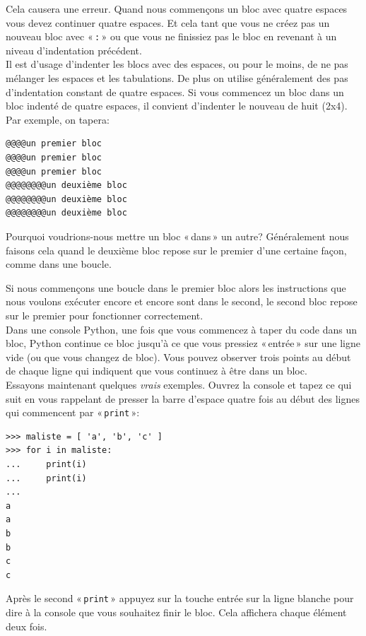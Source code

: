 Cela causera une erreur. Quand nous commençons un bloc avec quatre espaces vous devez continuer quatre espaces. Et cela tant que vous ne créez pas un nouveau bloc avec « \verb+:+ » ou que vous ne finissiez pas le bloc en revenant à un niveau d'indentation précédent.\\

Il est d'usage d'indenter les blocs avec des espaces, ou pour le moins, de ne pas mélanger les espaces et les tabulations. De plus on utilise généralement des pas d'indentation constant de quatre espaces.
Si vous commencez un bloc dans un bloc indenté de quatre espaces, il convient d'indenter le nouveau de huit (2x4).
Par exemple, on tapera:

\begin{Verbatim}[frame=single,rulecolor=\color{gray}, label=ne pas saisir]
@@@@un premier bloc
@@@@un premier bloc
@@@@un premier bloc
@@@@@@@@un deuxième bloc
@@@@@@@@un deuxième bloc
@@@@@@@@un deuxième bloc
\end{Verbatim}

Pourquoi voudrions-nous mettre un bloc « dans » un autre? Généralement nous faisons cela quand le deuxième bloc repose sur le premier d'une certaine façon, comme dans une boucle.

Si nous commençons une boucle dans le premier bloc alors les instructions que nous voulons exécuter encore et encore sont dans le second, le second bloc repose sur le premier pour fonctionner correctement.\\

Dans une console Python, une fois que vous commencez à taper du code dans un bloc, Python continue ce bloc jusqu'à ce que vous pressiez « entrée » sur une ligne vide (ou que vous changez de bloc). Vous pouvez observer trois points au début de chaque ligne qui indiquent que vous continuez à être dans un bloc.\\

Essayons maintenant quelques \emph{vrais} exemples. Ouvrez la console et tapez ce qui suit en vous rappelant de presser la barre d'espace quatre fois au début des lignes qui commencent par « \texttt{print} »:

\begin{Verbatim}[frame=single,rulecolor=\color{green}, label=à saisir avec attention]
>>> maliste = [ 'a', 'b', 'c' ]
>>> for i in maliste:
...     print(i)
...     print(i)
...
a
a
b
b
c
c
\end{Verbatim} 

Après le second « \texttt{print} » appuyez sur la touche entrée sur la ligne blanche pour dire à la console que vous souhaitez finir le bloc. Cela affichera chaque élément deux fois.\\

